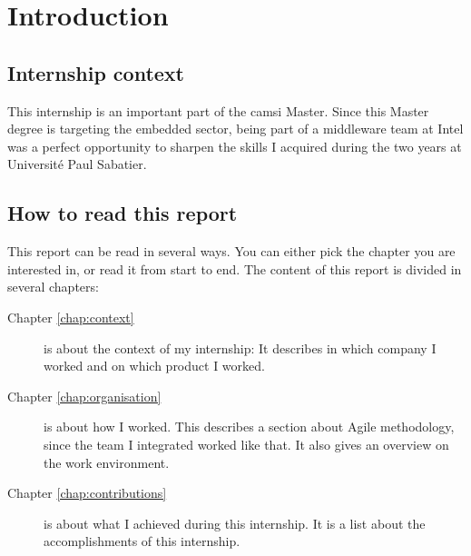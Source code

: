 \chapter{Introduction}

\section{Internship context}
This internship is an important part of the \gls{camsi} Master.
Since this Master degree is targeting the embedded sector, being part of a middleware team at Intel
was a perfect opportunity to sharpen the skills I acquired during the two years at Université Paul Sabatier.

\section{How to read this report}

This report can be read in several ways. You can either pick the chapter you are
interested in, or read it from start to end. The content of this report
is divided in several chapters:

\begin{description}
    \item[Chapter \ref{chap:context}] is about the context of my internship: It describes in which company I worked and on which product I worked.
    \item[Chapter \ref{chap:organisation}] is about how I worked. This describes a section about Agile methodology, since the
        team I integrated worked like that.
        It also gives an overview on the work environment.
    \item[Chapter \ref{chap:contributions}] is about what I achieved during this internship. It is a list about the accomplishments
        of this internship.
\end{description}
